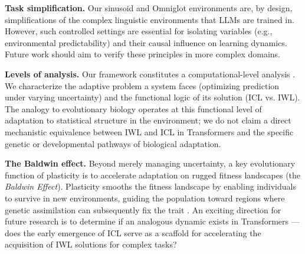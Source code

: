 \textbf{Task simplification.} Our sinusoid and Omniglot environments are, by design, simplifications of the complex linguistic environments that LLMs are trained in. However, such controlled settings are essential for isolating variables (e.g., environmental predictability) and their causal influence on learning dynamics. Future work should aim to verify these principles in more complex domains.


\textbf{Levels of analysis.}
Our framework constitutes a computational-level analysis \cite{marr82vision, ku2025using}. We characterize the adaptive problem a system faces (optimizing prediction under varying uncertainty) and the functional logic of its solution (ICL vs. IWL). The analogy to evolutionary biology operates at this functional level of adaptation to statistical structure in the environment; we do not claim a direct mechanistic equivalence between IWL and ICL in Transformers and the specific genetic or developmental pathways of biological adaptation.


\textbf{The Baldwin effect.}
Beyond merely managing uncertainty, a key evolutionary function of plasticity is to accelerate adaptation on rugged fitness landscapes (the \textit{Baldwin Effect}). Plasticity smooths the fitness landscape by enabling individuals to survive in new environments, guiding the population toward regions where genetic assimilation can subsequently fix the trait \cite{hinton1987learning, fernando2018meta}. An exciting direction for future research is to determine if an analogous dynamic exists in Transformers --- does the early emergence of ICL serve as a scaffold for accelerating the acquisition of IWL solutions for complex tasks?

